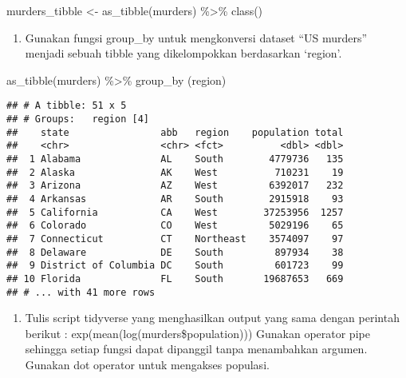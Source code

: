 \documentclass[
]{article}
\newenvironment{Shaded}{\begin{snugshade}}{\end{snugshade}}
\newcommand{\FunctionTok}[1]{\textcolor[rgb]{0.00,0.00,0.00}{#1}}
\newcommand{\NormalTok}[1]{#1}
\newcommand{\OtherTok}[1]{\textcolor[rgb]{0.56,0.35,0.01}{#1}}
\newcommand{\SpecialCharTok}[1]{\textcolor[rgb]{0.00,0.00,0.00}{#1}}
\providecommand{\tightlist}{%
  \setlength{\itemsep}{0pt}\setlength{\parskip}{0pt}}
\begin{document}
\begin{Shaded}
\begin{Highlighting}[]
\NormalTok{murders\_tibble }\OtherTok{\textless{}{-}} \FunctionTok{as\_tibble}\NormalTok{(murders) }\SpecialCharTok{\%\textgreater{}\%} \FunctionTok{class}\NormalTok{() }
\end{Highlighting}
\end{Shaded}

\begin{enumerate}
\def\labelenumi{\arabic{enumi}.}
\setcounter{enumi}{1}
\tightlist
\item
  Gunakan fungsi group\_by untuk mengkonversi dataset ``US murders''
  menjadi sebuah tibble yang dikelompokkan berdasarkan `region'.
\end{enumerate}

\begin{Shaded}
\begin{Highlighting}[]
\FunctionTok{as\_tibble}\NormalTok{(murders) }\SpecialCharTok{\%\textgreater{}\%} \FunctionTok{group\_by}\NormalTok{ (region)}
\end{Highlighting}
\end{Shaded}

\begin{verbatim}
## # A tibble: 51 x 5
## # Groups:   region [4]
##    state                abb   region    population total
##    <chr>                <chr> <fct>          <dbl> <dbl>
##  1 Alabama              AL    South        4779736   135
##  2 Alaska               AK    West          710231    19
##  3 Arizona              AZ    West         6392017   232
##  4 Arkansas             AR    South        2915918    93
##  5 California           CA    West        37253956  1257
##  6 Colorado             CO    West         5029196    65
##  7 Connecticut          CT    Northeast    3574097    97
##  8 Delaware             DE    South         897934    38
##  9 District of Columbia DC    South         601723    99
## 10 Florida              FL    South       19687653   669
## # ... with 41 more rows
\end{verbatim}

\begin{enumerate}
\def\labelenumi{\arabic{enumi}.}
\setcounter{enumi}{2}
\tightlist
\item
  Tulis script tidyverse yang menghasilkan output yang sama dengan
  perintah berikut : exp(mean(log(murders\$population))) Gunakan
  operator pipe sehingga setiap fungsi dapat dipanggil tanpa menambahkan
  argumen. Gunakan dot operator untuk mengakses populasi.
\end{enumerate}
\end{document}
